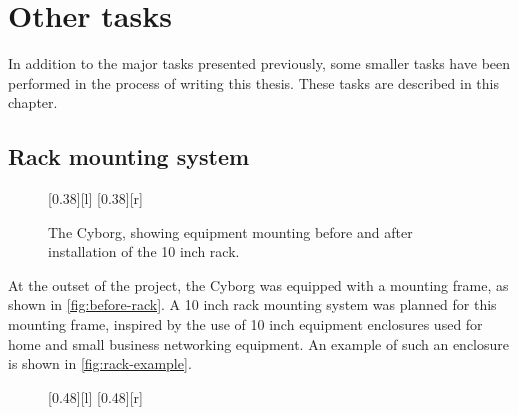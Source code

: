 \documentclass[\rootfolder/main.tex]{subfiles}
\begin{document}
\chapter{Other tasks}
\label{ch:other-tasks} %

In addition to the major tasks presented previously, some smaller tasks have been performed in the process of writing this thesis.
These tasks are described in this chapter.


\section{Rack mounting system}

\begin{figure}[h]
    \centering
    [0.38\columnwidth][l]{}
    [0.38\columnwidth][r]{}
    \caption{The Cyborg, showing equipment mounting before and after installation of the 10 inch rack.}
    \label{fig:before-after-rack}
\end{figure}

At the outset of the project, the Cyborg was equipped with a mounting frame, as shown in \cref{fig:before-rack}.
A 10 inch rack mounting system was planned for this mounting frame, inspired by the use of 10 inch equipment enclosures used for home and small business networking equipment.
An example of such an enclosure is shown in \cref{fig:rack-example}.

\begin{figure}[h]
    [0.48\columnwidth][l]{}
    [0.48\columnwidth][r]{}
\end{figure}
\end{document}

